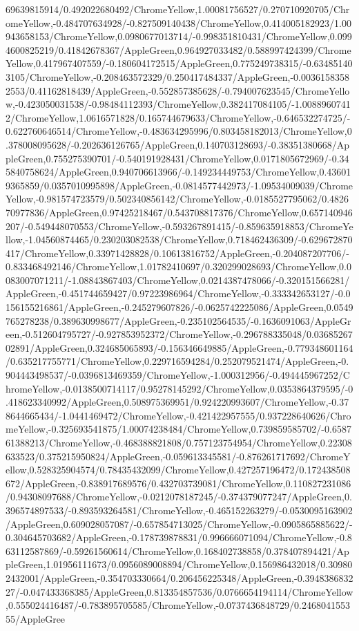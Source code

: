 {\begin{tikzternal}
69639815914/0.492022680492/ChromeYellow,1.00081756527/0.270710920705/ChromeYellow,-0.484707634928/-0.827509140438/ChromeYellow,0.414005182923/1.00943658153/ChromeYellow,0.0980677013714/-0.998351810431/ChromeYellow,0.0994600825219/0.41842678367/AppleGreen,0.964927033482/0.588997424399/ChromeYellow,0.417967407559/-0.180604172515/AppleGreen,0.775249738315/-0.634851403105/ChromeYellow,-0.208463572329/0.250417484337/AppleGreen,-0.00361583582553/0.41162818439/AppleGreen,-0.552857385628/-0.794007623545/ChromeYellow,-0.423050031538/-0.98484112393/ChromeYellow,0.382417084105/-1.00889607412/ChromeYellow,1.0616571828/0.165744679633/ChromeYellow,-0.646532274725/-0.622760646514/ChromeYellow,-0.483634295996/0.803458182013/ChromeYellow,0.378008095628/-0.202636126765/AppleGreen,0.140703128693/-0.38351380668/AppleGreen,0.755275390701/-0.540191928431/ChromeYellow,0.0171805672969/-0.345840758624/AppleGreen,0.940706613966/-0.149234449753/ChromeYellow,0.436019365859/0.0357010995898/AppleGreen,-0.0814577442973/-1.09534009039/ChromeYellow,-0.981574723579/0.502340856142/ChromeYellow,-0.0185527795062/0.482670977836/AppleGreen,0.97425218467/0.543708817376/ChromeYellow,0.657140946207/-0.549448070553/ChromeYellow,-0.593267891415/-0.859635918853/ChromeYellow,-1.04560874465/0.230203082538/ChromeYellow,0.718462436309/-0.629672870417/ChromeYellow,0.33971428828/0.10613816752/AppleGreen,-0.204087207706/-0.833468492146/ChromeYellow,1.01782410697/0.320299028693/ChromeYellow,0.0083007071211/-1.08843867403/ChromeYellow,0.0214387478066/-0.320151566281/AppleGreen,-0.451744659427/0.97223986964/ChromeYellow,-0.333342653127/-0.0156155216861/AppleGreen,-0.245279607826/-0.0625742225086/AppleGreen,0.0549765278238/0.389630998677/AppleGreen,-0.235102564535/-0.1636091063/AppleGreen,-0.512604795727/-0.927853952372/ChromeYellow,-0.296788335048/0.0368526702891/AppleGreen,0.324685065893/-0.156346649885/AppleGreen,-0.779348601164/0.635217755771/ChromeYellow,0.229716594284/0.252079521474/AppleGreen,-0.904443498537/-0.0396813469359/ChromeYellow,-1.000312956/-0.494445967252/ChromeYellow,-0.0138500714117/0.95278145292/ChromeYellow,0.0353864379595/-0.418623340992/AppleGreen,0.508975369951/0.924220993607/ChromeYellow,-0.378644665434/-1.0441469472/ChromeYellow,-0.421422957555/0.937228640626/ChromeYellow,-0.325693541875/1.00074238484/ChromeYellow,0.739859585702/-0.658761388213/ChromeYellow,-0.468388821808/0.757123754954/ChromeYellow,0.22308633523/0.375215950824/AppleGreen,-0.059613345581/-0.876261717692/ChromeYellow,0.528325904574/0.78435432099/ChromeYellow,0.427257196472/0.172438508672/AppleGreen,-0.838917689576/0.432703739081/ChromeYellow,0.110827231086/0.94308097688/ChromeYellow,-0.0212078187245/-0.374379077247/AppleGreen,0.396574897533/-0.893593264581/ChromeYellow,-0.465152263279/-0.0530095163902/AppleGreen,0.609028057087/-0.657854713025/ChromeYellow,-0.0905865885622/-0.304645703682/AppleGreen,-0.178739878831/0.996666071094/ChromeYellow,-0.863112587869/-0.59261560614/ChromeYellow,0.168402738858/0.378407894421/AppleGreen,1.01956111673/0.0956089008894/ChromeYellow,0.156986432018/0.309802432001/AppleGreen,-0.354703330664/0.206456225348/AppleGreen,-0.394838683227/-0.047433368385/AppleGreen,0.813354857536/0.0766654194114/ChromeYellow,0.555024416487/-0.783895705585/ChromeYellow,-0.0737436848729/0.246804155355/AppleGree
\end{tikzternal}}
